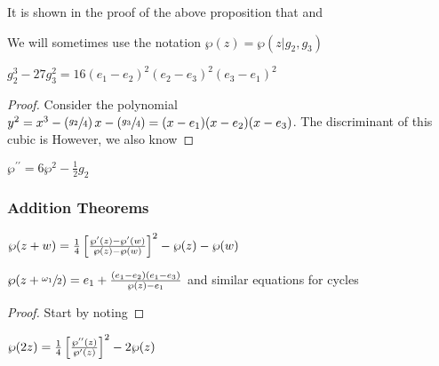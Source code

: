 \documentclass{article}
\begin{document}
\begin{remark}
	It is shown in the proof of the above proposition that 
	and 
\end{remark}

\begin{remark}
	We will sometimes use the notation $\wp(z) = \wp(z | g_2, g_3)$
\end{remark}

\begin{lemma}
	$g_2^3 - 27g_3^2 = 16(e_1 - e_2)^2(e_2 - e_3)^2 (e_3 - e_1)^2$
\end{lemma}
\begin{proof}
	Consider the polynomial $y^2 = x^3 - \left( \sfrac{g_2}{4} \right)x - \left( \sfrac{g_3}{4} \right) = (x-e_1)(x-e_2)(x-e_3)$. The discriminant of this cubic is 
	However, we also know 
\end{proof}


\begin{corollary}
	$\wp^{\prime \prime} = 6\wp^2 - \frac{1}{2}g_2
	$\end{corollary}

\subsubsection{Addition Theorems}

\begin{prop}
	$\wp(z+w) = \frac{1}{4} \left[ \frac{\wp^\prime(z) - \wp^\prime(w)}{\wp(z) - \wp(w)} \right]^2 - \wp(z) - \wp(w)$
\end{prop}
\begin{corollary}
	$\wp(z + \sfrac{\omega_1}{2}) = e_1 + \frac{(e_1 - e_2)(e_1 - e_3)}{\wp(z) - e_1}$ and similar equations for cycles 
\end{corollary}
\begin{proof}
	Start by noting 
\end{proof}


\begin{corollary}
	$\wp(2z) = \frac{1}{4} \left[ \frac{\wp^{\prime \prime}(z)}{\wp^\prime(z)} \right]^2 - 2\wp(z)$
\end{corollary}
\end{document}
